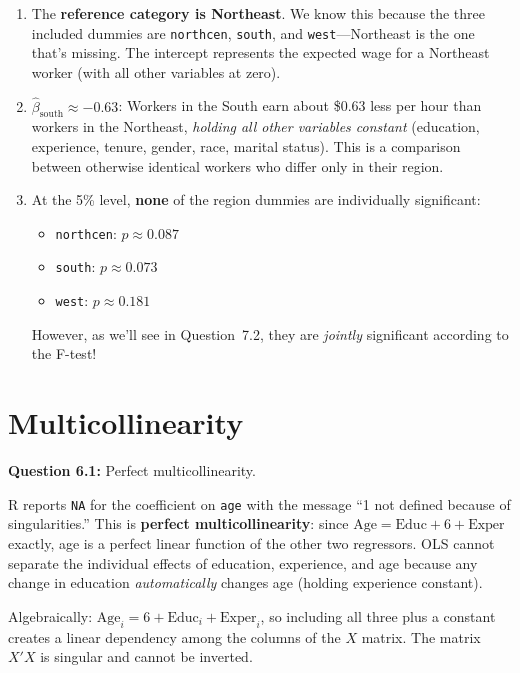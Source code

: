 \documentclass[11pt,letterpaper]{article}
\begin{document}
\begin{answer}
\begin{enumerate}[label=(\alph*)]
\item The \textbf{reference category is Northeast}. We know this because the three included dummies are \texttt{northcen}, \texttt{south}, and \texttt{west}---Northeast is the one that's missing. The intercept represents the expected wage for a Northeast worker (with all other variables at zero).

\item $\hat{\beta}_{\text{south}} \approx -0.63$: Workers in the South earn about \$0.63 less per hour than workers in the Northeast, \textit{holding all other variables constant} (education, experience, tenure, gender, race, marital status). This is a comparison between otherwise identical workers who differ only in their region.

\item At the 5\% level, \textbf{none} of the region dummies are individually significant:
\begin{itemize}[noitemsep]
\item \texttt{northcen}: $p \approx 0.087$
\item \texttt{south}: $p \approx 0.073$
\item \texttt{west}: $p \approx 0.181$
\end{itemize}
However, as we'll see in Question~7.2, they are \textit{jointly} significant according to the F-test!
\end{enumerate}
\end{answer}

\newpage

\section{Multicollinearity}

\textbf{Question 6.1:} Perfect multicollinearity.

\begin{answer}
R reports \texttt{NA} for the coefficient on \texttt{age} with the message ``1 not defined because of singularities.'' This is \textbf{perfect multicollinearity}: since $\text{Age} = \text{Educ} + 6 + \text{Exper}$ exactly, age is a perfect linear function of the other two regressors. OLS cannot separate the individual effects of education, experience, and age because any change in education \textit{automatically} changes age (holding experience constant).

Algebraically: $\text{Age}_i = 6 + \text{Educ}_i + \text{Exper}_i$, so including all three plus a constant creates a linear dependency among the columns of the $X$ matrix. The matrix $X'X$ is singular and cannot be inverted.
\end{answer}
\end{document}
